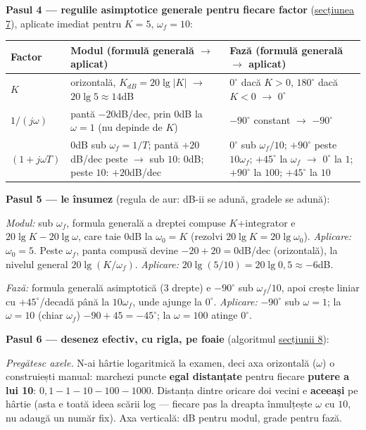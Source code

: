 \documentclass[10pt,a4paper]{article}
\begin{document}
\textbf{Pasul 4 — regulile asimptotice generale pentru fiecare factor} (\hyperref[sec:7]{secțiunea 7}), aplicate imediat pentru $K{=}5,\,\omega_f{=}10$:
\begin{center}
\footnotesize
\begin{tabular}{|p{2.5cm}|p{6.6cm}|p{6.9cm}|}
\hline
\textbf{Factor} & \textbf{Modul (formulă generală $\to$ aplicat)} & \textbf{Fază (formulă generală $\to$ aplicat)} \\\hline
$K$ & orizontală, $K_{dB}{=}20\lg|K|$ $\to$ $20\lg5\approx14$dB & $0^\circ$ dacă $K{>}0$, $180^\circ$ dacă $K{<}0$ $\to$ $0^\circ$ \\\hline
$1/(j\omega)$ & pantă $-20$dB/dec, prin $0$dB la $\omega{=}1$ (nu depinde de $K$) & $-90^\circ$ constant $\to$ $-90^\circ$ \\\hline
$(1{+}j\omega T)$ & $0$dB sub $\omega_f{=}1/T$; pantă $+20$dB/dec peste $\to$ sub $10$: $0$dB; peste $10$: $+20$dB/dec & $0^\circ$ sub $\omega_f/10$; $+90^\circ$ peste $10\omega_f$; $+45^\circ$ la $\omega_f$ $\to$ $0^\circ$ la $1$; $+90^\circ$ la $100$; $+45^\circ$ la $10$ \\\hline
\end{tabular}
\end{center}

\textbf{Pasul 5 — le însumez} (regula de aur: dB-ii se adună, gradele se adună):

\textit{Modul:} sub $\omega_f$, formula generală a dreptei compuse $K$+integrator e $20\lg K-20\lg\omega$, care taie $0$dB la $\omega_0=K$ (rezolvi $20\lg K=20\lg\omega_0$). \textit{Aplicare:} $\omega_0{=}5$. Peste $\omega_f$, panta compusă devine $-20{+}20{=}0$dB/dec (orizontală), la nivelul general $20\lg(K/\omega_f)$. \textit{Aplicare:} $20\lg(5/10){=}20\lg0{,}5\approx-6$dB.

\textit{Fază:} formula generală asimptotică (3 drepte) e $-90^\circ$ sub $\omega_f/10$, apoi crește liniar cu $+45^\circ$/decadă până la $10\omega_f$, unde ajunge la $0^\circ$. \textit{Aplicare:} $-90^\circ$ sub $\omega{=}1$; la $\omega{=}10$ (chiar $\omega_f$) $-90{+}45{=}-45^\circ$; la $\omega{=}100$ atinge $0^\circ$.

\textbf{Pasul 6 — desenez efectiv, cu rigla, pe foaie} (algoritmul \hyperref[sec:8]{secțiunii 8}):

\textit{Pregătesc axele.} N-ai hârtie logaritmică la examen, deci axa orizontală ($\omega$) o construiești manual: marchezi puncte \textbf{egal distanțate} pentru fiecare \textbf{putere a lui 10}: $0{,}1-1-10-100-1000$. Distanța dintre oricare doi vecini e \textbf{aceeași} pe hârtie (asta e toată ideea scării log — fiecare pas la dreapta înmulțește $\omega$ cu $10$, nu adaugă un număr fix). Axa verticală: dB pentru modul, grade pentru fază.
\end{document}
